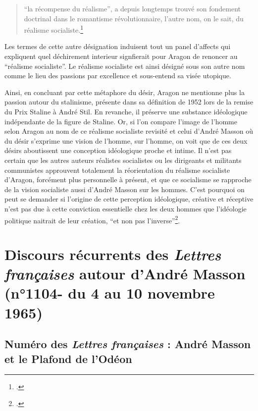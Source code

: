 \begin{quote}
\enquote{la récompense du réalisme}, a depuis longtemps trouvé son fondement doctrinal dans le romantisme révolutionnaire, l'autre nom, on le sait, du réalisme socialiste.\footcite[p1012]{these}\end{quote}

Les termes de cette autre désignation induisent tout un panel d'affects qui expliquent quel déchirement interieur signfierait pour Aragon de renoncer au \enquote{réalisme socialiste}. Le réalisme socialiste est ainsi désigné sous son autre nom comme le lieu des passions par excellence et sous-entend sa visée utopique. 


	 Ainsi, en concluant par cette métaphore du désir, Aragon ne mentionne plus la passion autour du stalinisme, présente dans sa définition de 1952 lors de la remise du Prix Staline à André Stil. En revanche, il préserve une substance idéologique indépendante de la figure de Staline. Or, si l’on compare l’image de l’homme selon Aragon au nom de ce réalisme socialiste revisité et celui d’André Masson où du désir s’exprime une vision de l’homme, sur l’homme, on voit que de ces deux désirs aboutissent une conception idéologique proche et intime. Il n’est pas certain que les autres auteurs réalistes socialistes ou les dirigeants et militants communistes approuvent totalement la réorientation du réalisme socialiste d’Aragon, forcément plus personnelle à présent, et que ce socialisme se rapproche de la vision socialiste aussi d’André Masson sur les hommes. C’est pourquoi on peut se demander si l’origine de cette perception idéologique, créative et réceptive n’est pas due à cette conviction essentielle chez les deux hommes que l’idéologie politique naitrait de leur création, \enquote{et non pas l’inverse}\footcite{}. 

\section{Discours récurrents des \emph{Lettres françaises} autour d’André Masson (n°1104- du 4 au 10 novembre 1965)}  

\subsection{Numéro des \emph{Lettres françaises} : André Masson et le Plafond de l'Odéon }


